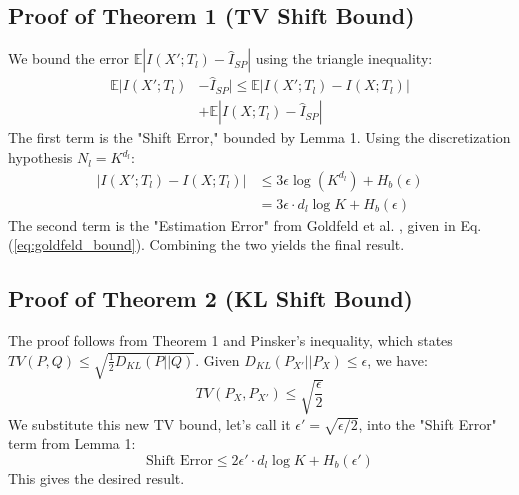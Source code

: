\documentclass[conference]{IEEEtran}
\begin{document}
\subsection{Proof of Theorem 1 (TV Shift Bound)}
We bound the error $\mathbb{E}|I(X'; T_l) - \hat{I}_{SP}|$ using the triangle inequality:
\begin{equation}
\begin{split}
    \mathbb{E}|I(X'; T_l) &- \hat{I}_{SP}| \le \mathbb{E}|I(X'; T_l) - I(X; T_l)| \\
    & + \mathbb{E}|I(X; T_l) - \hat{I}_{SP}|
\end{split}
\end{equation}
The first term is the "Shift Error," bounded by Lemma 1. Using the discretization hypothesis $N_l = K^{d_l}$:
\begin{equation}
\begin{split}
    |I(X'; T_l) - I(X; T_l)| &\le 3\epsilon \log(K^{d_l}) + H_b(\epsilon) \\
    &= 3\epsilon \cdot d_l \log K + H_b(\epsilon)
\end{split}
\end{equation}
The second term is the "Estimation Error" from Goldfeld et al. \cite{goldfeld2019estimating}, given in Eq. (\ref{eq:goldfeld_bound}). Combining the two yields the final result.

\subsection{Proof of Theorem 2 (KL Shift Bound)}
The proof follows from Theorem 1 and Pinsker's inequality, which states $TV(P, Q) \le \sqrt{\frac{1}{2} D_{KL}(P || Q)}$. Given $D_{KL}(P_{X'} || P_X) \le \epsilon$, we have:
\begin{equation}
TV(P_X, P_{X'}) \le \sqrt{\frac{\epsilon}{2}}
\end{equation}
We substitute this new TV bound, let's call it $\epsilon' = \sqrt{\epsilon/2}$, into the "Shift Error" term from Lemma 1:
\begin{equation}
\text{Shift Error} \le 2\epsilon' \cdot d_l \log K + H_b(\epsilon')
\end{equation}
This gives the desired result.
\end{document}
